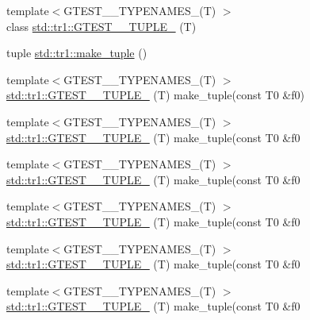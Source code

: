 \begin{DoxyCompactItemize}
\item 
{\footnotesize template$<$G\-T\-E\-S\-T\-\_\-\_\-\-T\-Y\-P\-E\-N\-A\-M\-E\-S\-\_\-(\-T) $>$ }\\class \hyperlink{namespacestd_1_1tr1_ab4f2c7d5458171bec6c4330fc5c7aba6}{std\-::tr1\-::\-G\-T\-E\-S\-T\-\_\-\_\-\-T\-U\-P\-L\-E\-\_\-} (T)
\item 
tuple \hyperlink{namespacestd_1_1tr1_af7e12a0f5b5791b5b7c49a5a17b85359}{std\-::tr1\-::make\-\_\-tuple} ()
\item 
{\footnotesize template$<$G\-T\-E\-S\-T\-\_\-\_\-\-T\-Y\-P\-E\-N\-A\-M\-E\-S\-\_\-(\-T) $>$ }\\\hyperlink{namespacestd_1_1tr1_a8b196fb65b7521a688f59c51418ab191}{std\-::tr1\-::\-G\-T\-E\-S\-T\-\_\-\_\-\-T\-U\-P\-L\-E\-\_\-} (T) make\-\_\-tuple(const T0 \&f0)
\item 
{\footnotesize template$<$G\-T\-E\-S\-T\-\_\-\_\-\-T\-Y\-P\-E\-N\-A\-M\-E\-S\-\_\-(\-T) $>$ }\\\hyperlink{namespacestd_1_1tr1_a90d9f0e7f95fa1c2093372d72493c3c1}{std\-::tr1\-::\-G\-T\-E\-S\-T\-\_\-\_\-\-T\-U\-P\-L\-E\-\_\-} (T) make\-\_\-tuple(const T0 \&f0
\item 
{\footnotesize template$<$G\-T\-E\-S\-T\-\_\-\_\-\-T\-Y\-P\-E\-N\-A\-M\-E\-S\-\_\-(\-T) $>$ }\\\hyperlink{namespacestd_1_1tr1_a4493d91e61718415264f7e72fea42930}{std\-::tr1\-::\-G\-T\-E\-S\-T\-\_\-\_\-\-T\-U\-P\-L\-E\-\_\-} (T) make\-\_\-tuple(const T0 \&f0
\item 
{\footnotesize template$<$G\-T\-E\-S\-T\-\_\-\_\-\-T\-Y\-P\-E\-N\-A\-M\-E\-S\-\_\-(\-T) $>$ }\\\hyperlink{namespacestd_1_1tr1_a4e57e6fab4219802275bd31821b31b58}{std\-::tr1\-::\-G\-T\-E\-S\-T\-\_\-\_\-\-T\-U\-P\-L\-E\-\_\-} (T) make\-\_\-tuple(const T0 \&f0
\item 
{\footnotesize template$<$G\-T\-E\-S\-T\-\_\-\_\-\-T\-Y\-P\-E\-N\-A\-M\-E\-S\-\_\-(\-T) $>$ }\\\hyperlink{namespacestd_1_1tr1_a6f8af2da768a7ea1e48b2700d1288166}{std\-::tr1\-::\-G\-T\-E\-S\-T\-\_\-\_\-\-T\-U\-P\-L\-E\-\_\-} (T) make\-\_\-tuple(const T0 \&f0
\item 
{\footnotesize template$<$G\-T\-E\-S\-T\-\_\-\_\-\-T\-Y\-P\-E\-N\-A\-M\-E\-S\-\_\-(\-T) $>$ }\\\hyperlink{namespacestd_1_1tr1_a31cde155977a4544af2b44b51ffe69ac}{std\-::tr1\-::\-G\-T\-E\-S\-T\-\_\-\_\-\-T\-U\-P\-L\-E\-\_\-} (T) make\-\_\-tuple(const T0 \&f0
\item 

\end{DoxyCompactItemize}

